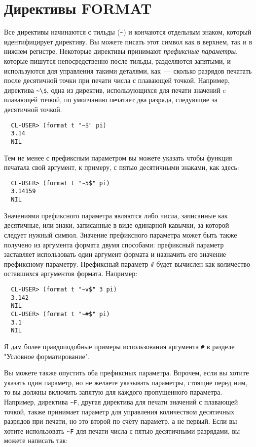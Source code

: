 {\section{Директивы FORMAT}

Все директивы начинаются с тильды (\lstinline!~!) и кончаются отдельным знаком, который
идентифицирует директиву. Вы можете писать этот символ как в верхнем, так и в нижнем
регистре. Некоторые директивы принимают \textit{префиксные параметры}, которые пишутся
непосредственно после тильды, разделяются запятыми, и используются для управления такими
деталями, как~--- сколько разрядов печатать после десятичной точки при печати числа с
плавающей точкой. Например, директива \lstinline!~\$!, одна из директив, использующихся
для печати значений c плавающей точкой, по умолчанию печатает два разряда, следующие за
десятичной точкой.

\begin{verbatim}
  CL-USER> (format t "~$" pi)
  3.14
  NIL
\end{verbatim}

Тем не менее с префиксным параметром вы можете указать чтобы функция печатала свой
аргумент, к примеру, с пятью десятичными знаками, как здесь:

\begin{verbatim}
  CL-USER> (format t "~5$" pi)
  3.14159
  NIL
\end{verbatim}

Значениями префиксного параметра являются либо числа, записанные как десятичные, или
знаки, записанные в виде одинарной кавычки, за которой следует нужный символ. Значение
префиксного параметра может быть также получено из аргумента формата двумя способами:
префиксный параметр  заставляет  использовать один аргумент формата и
назначить его значение префиксному параметру. Префиксный параметр \lstinline!#! будет вычислен
как количество оставшихся аргументов формата. Например:

\begin{verbatim}
  CL-USER> (format t "~v$" 3 pi)
  3.142
  NIL
  CL-USER> (format t "~#$" pi)
  3.1
  NIL
\end{verbatim}

Я дам более правдоподобные примеры использования аргумента \lstinline!#! в разделе "Условное форматирование".

Вы можете также опустить оба префиксных параметра. Впрочем, если вы хотите указать один
параметр, но не желаете указывать параметры, стоящие перед ним, то вы должны включить
запятую для каждого пропущенного параметра. Например, директива \lstinline!~F!, другая
директива для печати значений с плавающей точкой, также принимает параметр для управления
количеством десятичных разрядов при печати, но это второй по счёту параметр, а не
первый. Если вы хотите использовать \lstinline!~F! для печати числа с пятью десятичными
разрядами, вы можете написать так:

}
